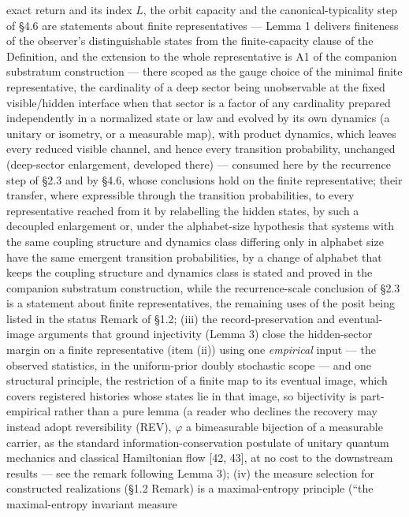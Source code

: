 \documentclass[
]{article}
\begin{document}
exact return and its index \(L\), the orbit capacity and the
canonical-typicality step of §4.6 are statements about finite
representatives --- Lemma 1 delivers finiteness of the observer's
distinguishable states from the finite-capacity clause of the
Definition, and the extension to the whole representative is A1 of the
companion substratum construction --- there scoped as the gauge choice
of the minimal finite representative, the cardinality of a deep sector
being unobservable at the fixed visible/hidden interface when that
sector is a factor of any cardinality prepared independently in a
normalized state or law and evolved by its own dynamics (a unitary or
isometry, or a measurable map), with product dynamics, which leaves
every reduced visible channel, and hence every transition probability,
unchanged (deep-sector enlargement, developed there) --- consumed here
by the recurrence step of §2.3 and by §4.6, whose conclusions hold on
the finite representative; their transfer, where expressible through the
transition probabilities, to every representative reached from it by
relabelling the hidden states, by such a decoupled enlargement or, under
the alphabet-size hypothesis that systems with the same coupling
structure and dynamics class differing only in alphabet size have the
same emergent transition probabilities, by a change of alphabet that
keeps the coupling structure and dynamics class is stated and proved in
the companion substratum construction, while the recurrence-scale
conclusion of §2.3 is a statement about finite representatives, the
remaining uses of the posit being listed in the status Remark of §1.2;
(iii) the record-preservation and eventual-image arguments that ground
injectivity (Lemma 3) close the hidden-sector margin on a finite
representative (item (ii)) using one \emph{empirical} input --- the
observed statistics, in the uniform-prior doubly stochastic scope ---
and one structural principle, the restriction of a finite map to its
eventual image, which covers registered histories whose states lie in
that image, so bijectivity is part-empirical rather than a pure lemma (a
reader who declines the recovery may instead adopt reversibility (REV),
\(\varphi\) a bimeasurable bijection of a measurable carrier, as the
standard information-conservation postulate of unitary quantum mechanics
and classical Hamiltonian flow {[}42, 43{]}, at no cost to the
downstream results --- see the remark following Lemma 3); (iv) the
measure selection for constructed realizations (§1.2 Remark) is a
maximal-entropy principle (``the maximal-entropy invariant measure
\end{document}
